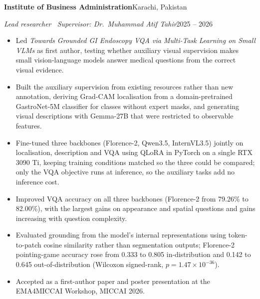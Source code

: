\documentclass[11pt,letterpaper]{article}
\newenvironment{entrybox}
  {\par\vspace{0.5em}\noindent\begin{minipage}{\linewidth}}
  {\end{minipage}\par}
\newcommand{\orgline}[2]{\textbf{#1}\hfill #2\par}
\newcommand{\roleline}[2]{\textit{#1}\hfill #2\par\vspace{0.15em}}
\begin{document}
\begin{entrybox}
  \orgline{Institute of Business Administration}{Karachi, Pakistan}
  \roleline{Lead researcher \textbar\ Supervisor: Dr.\ Muhammad Atif Tahir}{2025 -- 2026}
  \begin{itemize}
    \item Led \textit{Towards Grounded GI Endoscopy VQA via Multi-Task Learning on Small VLMs} as
          first author, testing whether auxiliary visual supervision makes small vision-language
          models answer medical questions from the correct visual evidence.
    \item Built the auxiliary supervision from existing resources rather than new annotation,
          deriving Grad-CAM localisation from a domain-pretrained GastroNet-5M classifier for
          classes without expert masks, and generating visual descriptions with Gemma-27B that
          were restricted to observable features.
    \item Fine-tuned three backbones (Florence-2, Qwen3.5, InternVL3.5) jointly on localisation,
          description and VQA using QLoRA in PyTorch on a single RTX 3090 Ti, keeping training
          conditions matched so the three could be compared; only the VQA objective runs at
          inference, so the auxiliary tasks add no inference cost.
    \item Improved VQA accuracy on all three backbones (Florence-2 from 79.26\% to 82.00\%), with
          the largest gains on appearance and spatial questions and gains increasing with
          question complexity.
    \item Evaluated grounding from the model's internal representations using token-to-patch
          cosine similarity rather than segmentation outputs; Florence-2 pointing-game accuracy
          rose from 0.333 to 0.805 in-distribution and 0.142 to 0.645 out-of-distribution
          (Wilcoxon signed-rank, $p = 1.47 \times 10^{-36}$).
    \item Accepted as a first-author paper and poster presentation at the EMA4MICCAI Workshop,
          MICCAI 2026.
  \end{itemize}
\end{entrybox}
\end{document}
